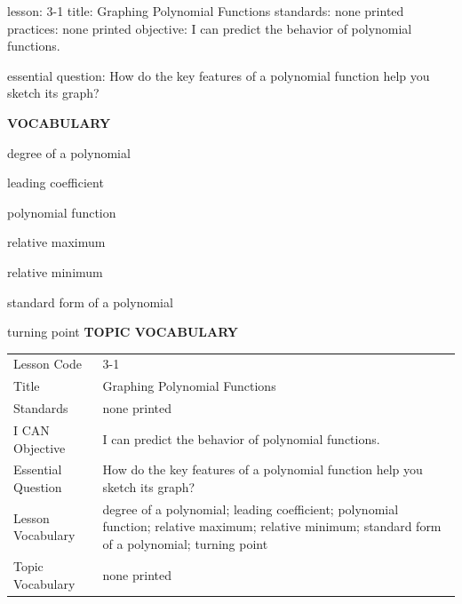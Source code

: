 \documentclass{article}
\newenvironment{lesson-meta}{}{}        %
\newcommand{\te}[1]{}                   %
\begin{document}
\begin{lesson-meta}
lesson: 3-1
title: Graphing Polynomial Functions
standards: none printed
practices: none printed
objective: I can predict the behavior of polynomial functions.

essential question: How do the key features of a polynomial function help you sketch its graph?

\textbf{VOCABULARY}
\item degree of a polynomial
\item leading coefficient
\item polynomial function
\item relative maximum
\item relative minimum
\item standard form of a polynomial
\item turning point
\textbf{TOPIC VOCABULARY}
\te{No separate topic vocabulary list is printed on these lesson pages.}
\begin{tabular}{ll}
Lesson Code & 3-1 \\
Title & Graphing Polynomial Functions \\
Standards & none printed \\
I CAN Objective & I can predict the behavior of polynomial functions. \\
Essential Question & How do the key features of a polynomial function help you sketch its graph? \\
Lesson Vocabulary & degree of a polynomial; leading coefficient; polynomial function; relative maximum; relative minimum; standard form of a polynomial; turning point \\
Topic Vocabulary & none printed \\
\end{tabular}
\end{lesson-meta}
\end{document}
